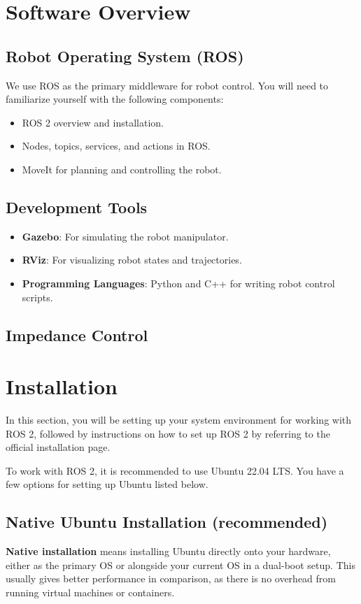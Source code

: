 \documentclass{article}
\begin{document}
\section{Software Overview}
\subsection{Robot Operating System (ROS)}
We use ROS as the primary middleware for robot control. You will need to familiarize yourself with the following components:
\begin{itemize}
    \item ROS 2 overview and installation.
    \item Nodes, topics, services, and actions in ROS.
    \item MoveIt for planning and controlling the robot.
\end{itemize}

\subsection{Development Tools}
\begin{itemize}
    \item \textbf{Gazebo}: For simulating the robot manipulator.
    \item \textbf{RViz}: For visualizing robot states and trajectories.
    \item \textbf{Programming Languages}: Python and C++ for writing robot control scripts.
\end{itemize}

\subsection{Impedance Control}

\section{Installation}
In this section, you will be setting up your system environment for working with ROS 2, followed by instructions on how to set up ROS 2 by referring to the official installation page.

To work with ROS 2, it is recommended to use Ubuntu 22.04 LTS. You have a few options for setting up Ubuntu listed below.

\subsection{Native Ubuntu Installation (recommended)}
\textbf{Native installation} means installing Ubuntu directly onto your hardware, either as the primary OS or alongside your current OS in a dual-boot setup. This usually gives better performance in comparison, as there is no overhead from running virtual machines or containers.
\end{document}
